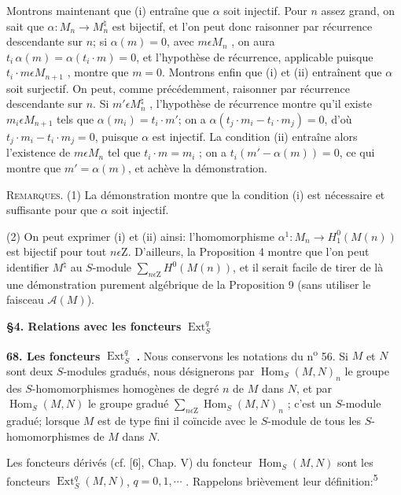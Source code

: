 Montrons maintenant que (i) entraîne que $\alpha$ soit injectif. Pour $n$ assez grand, on sait que $\alpha : M_n \to M_n^\natural$ est bijectif, et l'on peut donc raisonner par récurrence descendante sur $n$; si $\alpha(m) = 0$, avec $m \epsilon M_n$ , on aura $t_i\,\alpha(m) = \alpha(t_i\cdot m) = 0$, et l'hypothèse de récurrence, applicable puisque $t_i\cdot m \epsilon M_{n+1}$ , montre que $m = 0$. Montrons enfin que (i) et (ii) entraînent que $\alpha$ soit surjectif. On peut, comme précédemment, raisonner par récurrence descendante sur $n$. Si $m' \epsilon M_n^\natural$ , l'hypothèse de récurrence montre qu'il existe $m_i \epsilon M_{n+1}$ tels que $\alpha(m_i) = t_i\cdot m'$; on a $\alpha(t_j\cdot m_i - t_i\cdot m_j) = 0$, d'où $t_j\cdot m_i - t_i\cdot m_j = 0$, puisque $\alpha$ est injectif. La condition (ii) entraîne alors l'existence de $m \epsilon M_n$ tel que $t_i\cdot m = m_i$ ; on a $t_i(m' - \alpha(m)) = 0$, ce qui montre que $m' = \alpha(m)$, et achève la démonstration.

\textsc{Remarques}. (1) La démonstration montre que la condition (i) est nécessaire et suffisante pour que $\alpha$ soit injectif.

(2) On peut exprimer (i) et (ii) ainsi: l'homomorphisme $\alpha^1 : M_n \to H^0_1(M(n))$ est bijectif pour tout $n \epsilon \mathrm{Z}$. D'ailleurs, la Proposition 4 montre que l'on peut identifier $M^\natural$ au $S$-module $\sum_{n \epsilon \mathrm{Z}} H^0(M(n))$, et il serait facile de tirer de là
une démonstration purement algébrique de la Proposition 9 (sans utiliser le faisceau $\mathcal{A}(M)$).


\textbf{\S4. Relations avec les foncteurs} $\operatorname{Ext}_S^q$

\textbf{68. Les foncteurs} $\operatorname{Ext}_S^q$ \textbf{.} Nous conservons les notations du n\textsuperscript{o} 56. Si $M$ et $N$ sont deux $S$-modules gradués, nous désignerons par $\operatorname{Hom}_S(M, N)_n$ le groupe des $S$-homomorphismes homogènes de degré $n$ de $M$ dans $N$, et par $\operatorname{Hom}_S(M, N)$ le groupe gradué $\sum\nolimits_{n \epsilon \mathrm{Z}} \operatorname{Hom}_S(M, N)_n$ ; c'est un $S$-module gradué; lorsque $M$ est de type fini il coïncide avec le $S$-module de tous les $S$-homomorphismes de $M$ dans $N$.

Les foncteurs dérivés (cf. [6], Chap. V) du foncteur $\operatorname{Hom}_S(M, N)$ sont les foncteurs $\operatorname{Ext}_S^q(M, N)$, $q = 0, 1, \cdots$ . Rappelons brièvement leur définition:\textsuperscript{5}

